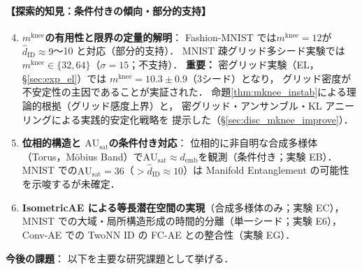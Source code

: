 \documentclass[11pt,a4paper]{jsarticle}
\newcommand{\AUsat}{\mathrm{AU}_{\mathrm{sat}}}
\newcommand{\mknee}{m^{\mathrm{knee}}}
\newcommand{\demb}{d_{\mathrm{emb}}}
\begin{document}
\paragraph{【探索的知見：条件付きの傾向・部分的支持】}
\begin{enumerate}
  \setcounter{enumi}{3}
  \item \textbf{$\mknee$の有用性と限界の定量的解明}：
        Fashion-MNIST では$\mknee = 12$が$\hat{d}_\mathrm{ID} \approx 9$〜10 と対応（部分的支持）．
        MNIST 疎グリッド多シード実験では$\mknee \in \{32, 64\}$（$\sigma=15$；不支持）．
        \textbf{重要：} 密グリッド実験（EL，§\ref{sec:exp_el}）では
        $\mknee = 10.3 \pm 0.9$（3シード）となり，
        グリッド密度が不安定性の主因であることが実証された．
        命題\ref{thm:mknee_instab}による理論的根拠（グリッド感度上界）と，
        密グリッド・アンサンブル・KL アニーリングによる実践的安定化戦略を
        提示した（§\ref{sec:disc_mknee_improve}）．
  \item \textbf{位相的構造と $\AUsat$の条件付き対応}：
        位相的に非自明な合成多様体（Torus，Möbius Band）で$\AUsat \approx \demb$を観測（条件付き；実験 EB）．
        MNIST での$\AUsat = 36$（$> \hat{d}_\mathrm{ID} \approx 10$）は Manifold Entanglement の可能性を示唆するが未確定．
  \item \textbf{IsometricAE による等長潜在空間の実現}（合成多様体のみ；実験 EC），
        MNIST での大域・局所構造形成の時間的分離（単一シード；実験 E6），
        Conv-AE での TwoNN ID の FC-AE との整合性（実験 EG）．
\end{enumerate}

\textbf{今後の課題}：
以下を主要な研究課題として挙げる．
\end{document}
